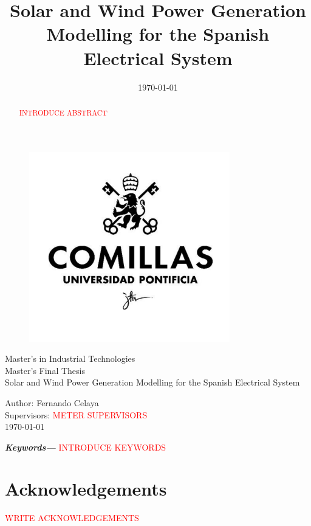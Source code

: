 \documentclass[12pt,a4paper,twoside]{article}
\title{Solar and Wind Power Generation Modelling for the Spanish Electrical System}
\date{\today}
\providecommand{\keywords}[1]
{
  \small	
  \textbf{\textit{Keywords---}} #1
}
\begin{document}
\pagestyle{empty}
\begin{titlepage}
  \begin{figure}
    \centering
    \includegraphics[width=0.3\linewidth]{assets/logo-comillas.png}
  \end{figure}
  \centering
  \Large 
  Master's in Industrial Technologies \\ Master's Final Thesis\\[36px]
  \Huge 
  Solar and Wind Power Generation Modelling for the Spanish Electrical System\\
  \Large
  \raggedright
  \vspace*{\fill}
  Author: Fernando Celaya\\
  Supervisors: \textcolor{red}{METER SUPERVISORS}\\
  \today

\end{titlepage}
\newpage

\begin{abstract}
  \textcolor{red}{INTRODUCE ABSTRACT}
\end{abstract}
\keywords{\textcolor{red}{INTRODUCE KEYWORDS}}
\newpage

\section*{Acknowledgements}
\textcolor{red}{WRITE ACKNOWLEDGEMENTS} 
\newpage

\thispagestyle{empty}
\tableofcontents
\newpage

\thispagestyle{empty}
\listoffigures
\listoftables
\newpage


\pagestyle{plain}
\clearpage
{} 

\newpage

\newpage

\newpage

\newpage

\newpage

\newpage
\begin{appendices}

\newpage
\end{appendices}

\printbibliography[heading=bibintoc]
\end{document}
